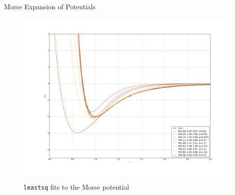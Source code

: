 \begin{chapter}{Morse Expansion of Potentials}
\begin{figure}[h!]
    \centering
\includegraphics[width=1.2\linewidth]{./figures/MorseFitsLeastsq/leastsqAll.pdf}
    \\

       \caption[\texttt{leastsq} fits to the Morse potential]{
	\texttt{leastsq} fits to the Morse potential
    \label{fig:MorseFitsLeastsq}
    }

\end{figure}


%	
%


\end{chapter}

